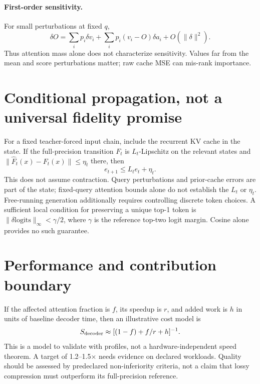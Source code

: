 \documentclass[11pt]{article}
\begin{document}
\paragraph{First-order sensitivity.}
For small perturbations at fixed $q$,
\[
 \delta O=\sum_i p_i\delta v_i+
              \sum_i p_i(v_i-O)\delta a_i+O(\|\delta\|^2).
\]
Thus attention mass alone does not characterize sensitivity. Values far from
the mean and score perturbations matter; raw cache MSE can mis-rank importance.

\section{Conditional propagation, not a universal fidelity promise}
For a fixed teacher-forced input chain, include the recurrent KV cache in the
state. If the full-precision transition $F_t$ is $L_t$-Lipschitz on the relevant
states and $\|\widehat F_t(x)-F_t(x)\|\le\eta_t$ there, then
\[
 e_{t+1}\le L_t e_t+\eta_t.
\]
This does not assume contraction. Query perturbations and prior-cache errors
are part of the state; fixed-query attention bounds alone do not establish
the $L_t$ or $\eta_t$. Free-running generation additionally requires controlling
discrete token choices. A sufficient local condition for preserving a unique
top-1 token is $\|\delta\mathrm{logits}\|_\infty<\gamma/2$, where $\gamma$ is the
reference top-two logit margin. Cosine alone provides no such guarantee.

\section{Performance and contribution boundary}
If the affected attention fraction is $f$, its speedup is $r$, and added work
is $h$ in units of baseline decoder time, then an illustrative cost model is
\[
 S_{\rm decoder}\approx[(1-f)+f/r+h]^{-1}.
\]
This is a model to validate with profiles, not a hardware-independent speed
theorem. A target of 1.2--1.5$\times$ needs evidence on declared workloads.
Quality should be assessed by predeclared non-inferiority criteria, not a claim
that lossy compression must outperform its full-precision reference.
\end{document}
